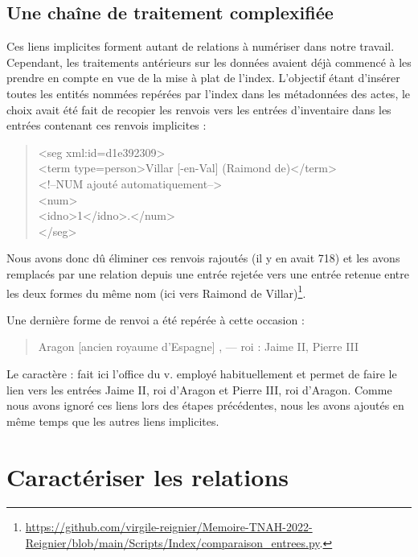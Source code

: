 \documentclass[a4paper,12pt,twoside]{book}
\begin{document}
	\subsection{Une chaîne de traitement complexifiée}
	
	Ces liens implicites forment autant de relations à numériser dans notre travail. Cependant, les traitements antérieurs sur les données avaient déjà commencé à les prendre en compte en vue de la mise à plat de l'index. L'objectif étant d'insérer toutes les entités nommées repérées par l'index dans les métadonnées des actes, le choix avait été fait de recopier les renvois vers les entrées d'inventaire dans les entrées contenant ces renvois implicites :
	
	\begin{quotation}
               <seg xml:id=\textquotesingle d1e392309\textquotesingle >\\
				\indent\indent<term type=\textquotesingle person\textquotesingle >Villar [-en-Val] (Raimond de)</term>\\
				\indent\indent<!--NUM ajouté automatiquement-->\\
				\indent{}\\
				\indent\indent\indent<idno>1</idno>.</num>\\
				\indent</seg>
	\end{quotation}
	
	
	\noindent Nous avons donc dû éliminer ces renvois rajoutés (il y en avait 718) et les avons remplacés par une relation depuis une entrée rejetée vers une entrée retenue entre les deux formes du même nom (ici vers \og Raimond de Villar\fg{})\footnote{\url{https://github.com/virgile-reignier/Memoire-TNAH-2022-Reignier/blob/main/Scripts/Index/comparaison_entrees.py}.}.
	
	Une dernière forme de renvoi a été repérée à cette occasion :
	
	\begin{quotation}
		Aragon [ancien royaume d'Espagne] , — roi : Jaime II, Pierre III
	\end{quotation}
	
	\noindent Le caractère \og :\fg{} fait ici l'office du \og v.\fg{} employé habituellement et permet de faire le lien vers les entrées \og Jaime II, roi d'Aragon\fg{} et \og Pierre III, roi d'Aragon\fg{}. Comme nous avons ignoré ces liens lors des étapes précédentes, nous les avons ajoutés en même temps que les autres liens implicites.
	
	\section{Caractériser les relations}
	
\end{document}

